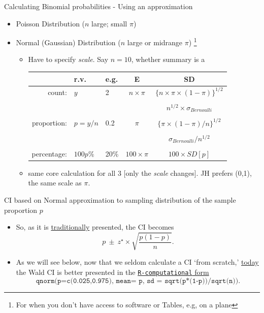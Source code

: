 \documentclass[handout]{beamer}\usepackage[]{graphicx}\usepackage[]{color}
\begin{document}
\begin{frame}{Calculating Binomial probabilities - Using an approximation}

\small
\begin{itemize}
	\item Poisson Distribution ($n$ large;  small $\pi$)
	\item Normal (Gaussian) Distribution ($n$ large or midrange $\pi $) \footnote{\footnotesize
		For when you don't have access to software or Tables, e.g, on a plane} 
	\begin{itemize}
		\item Have to specify \textit{scale}. Say $n=10$, whether summary is a 
		\begin{tabular}{rllcc}
			&  \textbf{r.v. }        &  \textbf{e.g.} & \textbf{E} & \textbf{SD} \\ 
			\hline
			count:          &  $y$        &  2 & $n \times \pi$ & $\{n \times \pi \times (1-\pi) \}^{1/2}$ \\
			& & & & \\
			& & & & $n^{1/2} \times \sigma_{Bernoulli}$ \\
			
			& & & & \\
			proportion:   & $p=y/n$  & 0.2 & $ \pi$ & $\{\pi \times (1-\pi) / n \}^{1/2}$ \\
			& & & & \\
			
			& & & &  $\sigma_{Bernoulli} / n^{1/2}$\\
			
			& & & & \\
			percentage: &$100p\%$ & 20\% & $100 \times \pi$ & $100 \times SD[p]$ \\
			\hline
		\end{tabular}
		\item same core calculation for all 3 [only the \textit{scale} changes]. JH prefers (0,1), the same scale as $\pi.$
		
	\end{itemize}
	
\end{itemize}

\end{frame}


\begin{frame}{CI based on Normal approximation to sampling distribution of the sample proportion $p$}
\small
\begin{itemize}
	\item So, as it is \underline{traditionally} presented,  the CI becomes
	$$p \  \pm  \ z^\star \times \sqrt{\frac{p(1-p)}{n}}.$$ \pause 
	\item As we will see below, now that we seldom calculate a CI `from scratch,'  \underline{today} the Wald CI is better presented in the \underline{\texttt{R-computational} form}
	\scriptsize{$$\texttt{qnorm(p=c(0.025,0.975),  mean= p,  sd = sqrt(p*(1-p))/sqrt(n))}.$$}
\end{itemize}
\end{frame}
\end{document}
